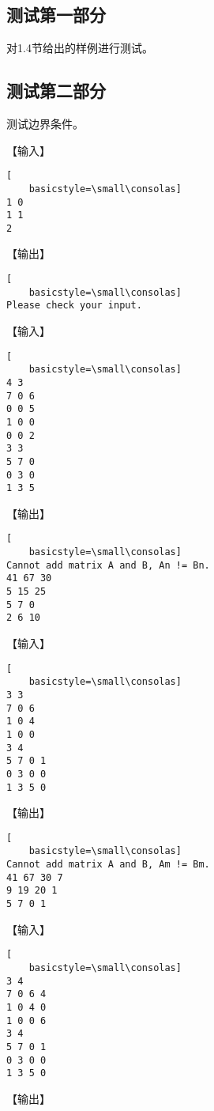 \documentclass{article}
\begin{document}
\subsection{测试第一部分}

对1.4节给出的样例进行测试。

\subsection{测试第二部分}

测试边界条件。

【输入】

\begin{lstlisting}[
    basicstyle=\small\consolas]
1 0
1 1
2
\end{lstlisting}

【输出】

\begin{lstlisting}[
    basicstyle=\small\consolas]
Please check your input.
\end{lstlisting}

【输入】

\begin{lstlisting}[
    basicstyle=\small\consolas]
4 3
7 0 6
0 0 5
1 0 0
0 0 2
3 3
5 7 0
0 3 0
1 3 5
\end{lstlisting}

【输出】

\begin{lstlisting}[
    basicstyle=\small\consolas]
Cannot add matrix A and B, An != Bn.
41 67 30 
5 15 25 
5 7 0 
2 6 10 
\end{lstlisting}

【输入】

\begin{lstlisting}[
    basicstyle=\small\consolas]
3 3
7 0 6
1 0 4
1 0 0
3 4
5 7 0 1
0 3 0 0
1 3 5 0
\end{lstlisting}

【输出】

\begin{lstlisting}[
    basicstyle=\small\consolas]
Cannot add matrix A and B, Am != Bm.
41 67 30 7 
9 19 20 1 
5 7 0 1 
\end{lstlisting}

【输入】

\begin{lstlisting}[
    basicstyle=\small\consolas]
3 4
7 0 6 4
1 0 4 0
1 0 0 6
3 4
5 7 0 1
0 3 0 0
1 3 5 0
\end{lstlisting}

【输出】
\end{document}

